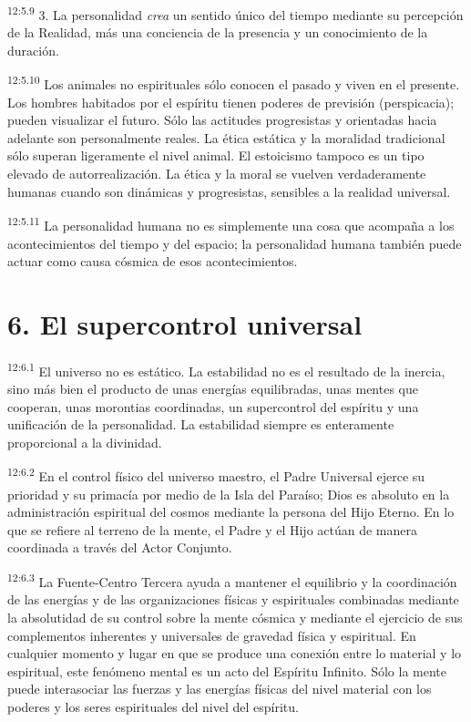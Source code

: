 \par
\textsuperscript{12:5.9} 3. La personalidad \textit{crea} un sentido único del tiempo mediante su percepción de la Realidad, más una conciencia de la presencia y un conocimiento de la duración.

\par
\textsuperscript{12:5.10} Los animales no espirituales sólo conocen el pasado y viven en el presente. Los hombres habitados por el espíritu tienen poderes de previsión (perspicacia); pueden visualizar el futuro. Sólo las actitudes progresistas y orientadas hacia adelante son personalmente reales. La ética estática y la moralidad tradicional sólo superan ligeramente el nivel animal. El estoicismo tampoco es un tipo elevado de autorrealización. La ética y la moral se vuelven verdaderamente humanas cuando son dinámicas y progresistas, sensibles a la realidad universal.

\par
\textsuperscript{12:5.11} La personalidad humana no es simplemente una cosa que acompaña a los acontecimientos del tiempo y del espacio; la personalidad humana también puede actuar como causa cósmica de esos acontecimientos.

\section*{6. El supercontrol universal}
\par
\textsuperscript{12:6.1} El universo no es estático. La estabilidad no es el resultado de la inercia, sino más bien el producto de unas energías equilibradas, unas mentes que cooperan, unas morontias coordinadas, un supercontrol del espíritu y una unificación de la personalidad. La estabilidad siempre es enteramente proporcional a la divinidad.

\par
\textsuperscript{12:6.2} En el control físico del universo maestro, el Padre Universal ejerce su prioridad y su primacía por medio de la Isla del Paraíso; Dios es absoluto en la administración espiritual del cosmos mediante la persona del Hijo Eterno. En lo que se refiere al terreno de la mente, el Padre y el Hijo actúan de manera coordinada a través del Actor Conjunto.

\par
\textsuperscript{12:6.3} La Fuente-Centro Tercera ayuda a mantener el equilibrio y la coordinación de las energías y de las organizaciones físicas y espirituales combinadas mediante la absolutidad de su control sobre la mente cósmica y mediante el ejercicio de sus complementos inherentes y universales de gravedad física y espiritual. En cualquier momento y lugar en que se produce una conexión entre lo material y lo espiritual, este fenómeno mental es un acto del Espíritu Infinito. Sólo la mente puede interasociar las fuerzas y las energías físicas del nivel material con los poderes y los seres espirituales del nivel del espíritu.

